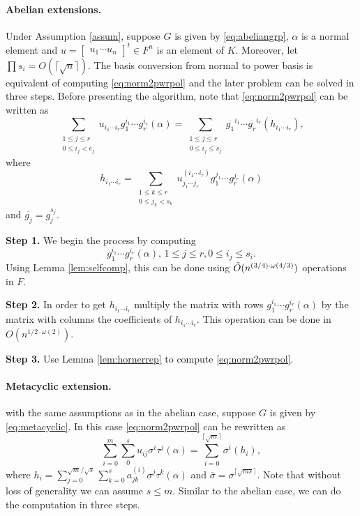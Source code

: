 \paragraph{Abelian extensions.} Under Assumption \ref{assum}, suppose $G$
is given by \eqref{eq:abeliangrp}, $\alpha$ is a normal element and $u
= \begin{bmatrix} u_1 \cdots u_n \end{bmatrix}^t \in F^n$ is an
element of $K$. Moreover, let $\prod s_i = O(\lceil \sqrt{n}
\rceil)$. The basis conversion from normal to power basis is
equivalent of computing \eqref{eq:norm2pwrpol} and the later problem
can be solved in three steps. Before presenting the algorithm, note
that \eqref{eq:norm2pwrpol} can be written as
$$\sum_{\substack{1 \leq j \leq r\\ 0 \leq i_j < e_j}} u_{i_1 \cdots
  i_r} g_1^{i_1} \cdots g_r^{i_r}(\alpha) = \sum_{\substack{1 \leq j
    \leq r\\ 0 \leq i_j \leq s_j}} \overline{g_1}^{i_1} \cdots
\overline{g_r}^{i_r} (h_{i_1 \cdots i_r}),$$ where $$h_{i_1 \cdots
  i_r} = \sum_{\substack{1 \leq k \leq r\\ 0 \leq j_k < s_k}} u^{(i_1
  \cdots i_r)}_{j_1 \cdots j_r} g_1^{j_1} \cdots g_r^{j_r}(\alpha)$$
and $\overline{g_j} = g_j^{s_j}$.

\smallskip\noindent\textbf{Step 1.} We begin the process by
computing $$g_1^{i_1} \cdots g_r^{i_r}(\alpha), \, 1 \leq j \leq r, 0
\leq i_j \leq s_i.$$ Using Lemma \ref{lem:selfcomp}, this can be done
using $\tilde{O}(n^{(3/4)\cdot \omega(4/3)})$ operations in $F$.

\smallskip\noindent\textbf{Step 2.} In order to get $h_{i_1 \cdots
  i_r}$ multiply the matrix with rows $g_1^{i_1} \cdots
g_r^{i_r}(\alpha)$ by the matrix with columns the coefficients of
$h_{i_1 \cdots i_r}$. This operation can be done in $O(n^{1/2 \cdot
  \omega(2)})$.

\smallskip\noindent\textbf{Step 3.} Use Lemma \ref{lem:hornerrep} to
compute \eqref{eq:norm2pwrpol}.

\paragraph{Metacyclic extension.} with the same assumptions as in the
abelian case, suppose $G$ is given by \eqref{eq:metacyclic}. In this
case \eqref{eq:norm2pwrpol} can be rewritten as
$$\sum_{i = 0}^m \sum_{0}^s u_{ij}\sigma^i \tau^j(\alpha) = \sum_{i =
  0}^{\lceil \sqrt{m} \rceil} \overline{\sigma}^i(h_i),$$ where $h_i =
\sum_{j = 0}^{\sqrt{m}/\sqrt{s}}\sum_{k =0}^{s} a_{jk}^{(i)}\sigma^j
\tau^k (\alpha)$ and $\overline{\sigma} = \sigma^{\lceil \sqrt{ms}
  \rceil}$.  Note that without loss of generality we can assume $s
\leq m$. Similar to the abelian case, we can do the computation in
three steps.

